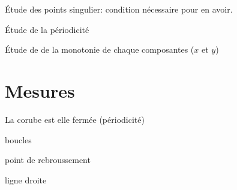 \documentclass[11pt,a4paper]{article}
\begin{document}
Étude des points singulier: condition nécessaire pour en avoir.

Étude de la périodicité

Étude de de la monotonie de chaque composantes ($x$ et $y$) 




\section{Mesures}
La corube est elle fermée (périodicité)

boucles

point de rebroussement

ligne droite



 
\end{document}
